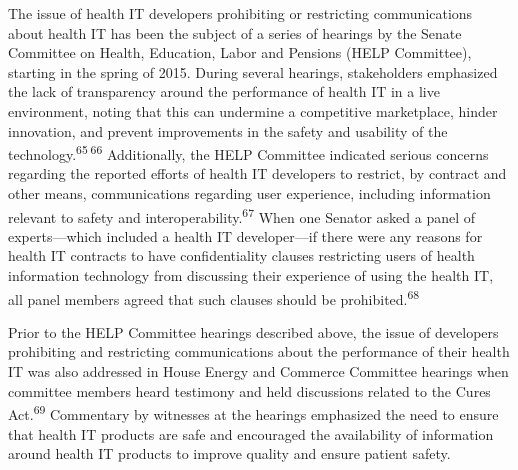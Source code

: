 \documentclass[twoside,11pt]{article}
\begin{document}
          The issue of health IT developers prohibiting or restricting communications about health IT has been the subject of a series of hearings by the Senate Committee on Health, Education, Labor and Pensions (HELP Committee), starting in the spring of 2015. During several hearings, stakeholders emphasized the lack of transparency around the performance of health IT in a live environment, noting that this can undermine a competitive marketplace, hinder innovation, and prevent improvements in the safety and usability of the technology.\textsuperscript{65} \textsuperscript{66}
             Additionally, the HELP Committee indicated serious concerns regarding the reported efforts of health IT developers to restrict, by contract and other means, communications regarding user experience, including information relevant to safety and interoperability.\textsuperscript{67}
             When one Senator asked a panel of experts—which included a health IT developer—if there were any reasons for health IT contracts to have confidentiality clauses restricting users of health information technology from discussing their experience of using the health IT, all panel members agreed that such clauses should be prohibited.\textsuperscript{68}
            
          








          Prior to the HELP Committee hearings described above, the issue of developers prohibiting and restricting communications about the performance of their health IT was also addressed in House Energy and Commerce Committee hearings when committee members heard testimony and held discussions related to the Cures Act.\textsuperscript{69}
             Commentary by witnesses at the hearings emphasized the need to ensure that health IT products are safe and encouraged the availability of information around health IT products to improve quality and ensure patient safety.
\end{document}
